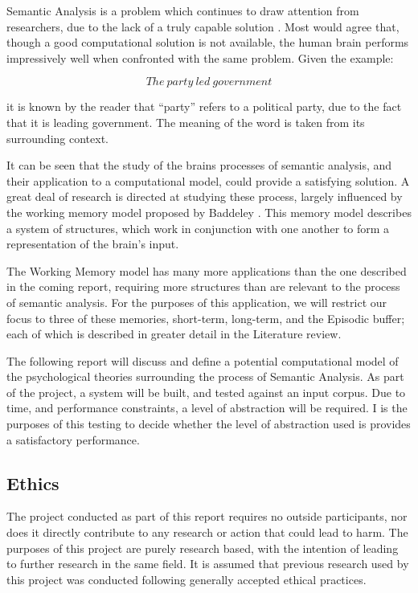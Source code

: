 \documentclass[]{article}
\begin{document}
Semantic Analysis is a problem which continues to draw attention from researchers, due to the lack of a truly capable solution \cite{NLPHandbook}. Most would agree that, though a good computational solution is not available, the human brain performs impressively well when confronted with the same problem. Given the example:

\[The\: party\: led\: government\]

it is known by the reader that “party” refers to a political party, due to the fact that it is leading government. The meaning of the word is taken from its surrounding context.

It can be seen that the study of the brains processes of semantic analysis, and their application to a computational model, could provide a satisfying solution. A great deal of research is directed at studying these process, largely influenced by the working memory model proposed by Baddeley \cite{MemoryBaddeleyEysenkAnderson}. This memory model describes a system of structures, which work in conjunction with one another to form a representation of the brain’s input. 

The Working Memory model has many more applications than the one described in the coming report, requiring more structures than are relevant to the process of semantic analysis. For the purposes of this application, we will restrict our focus to three of these memories, short-term, long-term, and the Episodic buffer\cite{MemoryBaddeleyEysenkAnderson}; each of which is described in greater detail in the Literature review.

The following report will discuss and define a potential computational model of the psychological theories surrounding the process of Semantic Analysis. As part of the project, a system will be built, and tested against an input corpus. Due to time, and performance constraints, a level of abstraction will be required. I is the purposes of this testing to decide whether the level of abstraction used is provides a satisfactory performance.

\subsection{Ethics}
\label{sec:IntroEthics}

The project conducted as part of this report requires no outside participants, nor does it directly contribute to any research or action that could lead to harm. The purposes of this project are purely research based, with the intention of leading to further research in the same field. It is assumed that previous research used by this project was conducted following generally accepted ethical practices.
\end{document}
